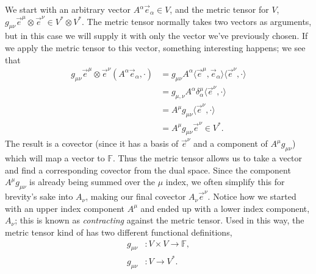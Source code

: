 We start with an arbitrary vector $A^\alpha \vec{e}_\alpha \in V$, and the metric tensor for $V$, $g_{\mu\nu} \vec{e}^\mu \otimes \vec{e}^\nu \in V^* \otimes V^*$.
The metric tensor normally takes two vectors as arguments, but in this case we will supply it with only the vector we've previously chosen.
If we apply the metric tensor to this vector, something interesting happens; we see that
\begin{align}
    g_{\mu\nu} \vec{e}^\mu \otimes \vec{e}^\nu (A^\alpha \vec{e}_\alpha, \cdot) &=
    g_{\mu\nu} A^\alpha \langle \vec{e}^\mu, \vec{e}_\alpha \rangle \langle \vec{e}^\nu, \cdot \rangle\label{eqn:metric-index-lowering} \\
    &= g_{\mu, \nu} A^\alpha \delta^\mu_\alpha \langle \vec{e}^\nu, \cdot \rangle \nonumber \\
    &= A^\mu g_{\mu\nu} \langle \vec{e}^\nu, \cdot \rangle \nonumber \\
    &= A^\mu g_{\mu\nu} \vec{e}^\nu \in V^* \nonumber.
\end{align}
The result is a covector (since it has a basis of $\vec{e}^\nu$ and a component of $A^\mu g_{\mu\nu}$) which will map a vector to $\mathbb{F}$.
Thus the metric tensor allows us to take a vector and find a corresponding covector from the dual space.
Since the component $A^\mu g_{\mu\nu}$ is already being summed over the $\mu$ index, we often simplify this for brevity's sake into $A_\nu$, making our final covector $A_\nu \vec{e}^\nu$. 
Notice how we started with an upper index component $A^\mu$ and ended up with a lower index component, $A_\nu$; this is known as \emph{contracting} against the metric tensor.
Used in this way, the metric tensor kind of has two different functional definitions,
\begin{align*}
    g_{\mu\nu} &: V \times V \to \mathbb{F}, \\
    g_{\mu\nu} &: V \to V^*.
\end{align*}
